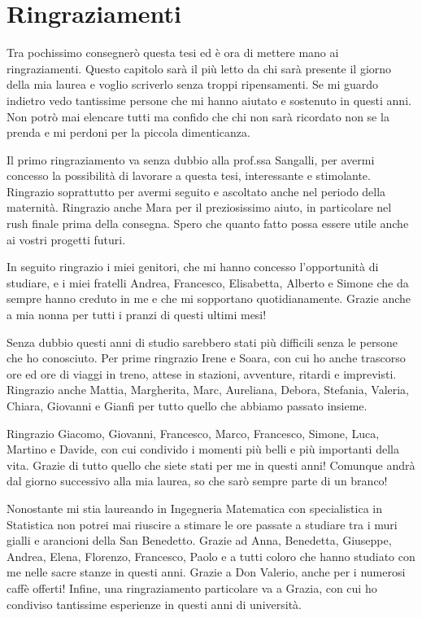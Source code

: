 \documentclass[a4paper,11pt,twoside,openright]{book}							%
\begin{document}
\chapter*{Ringraziamenti}
\thispagestyle{empty}
Tra pochissimo consegnerò questa tesi ed è ora di mettere mano ai ringraziamenti. Questo capitolo sarà il più letto da chi sarà presente il giorno della mia laurea e voglio scriverlo senza troppi ripensamenti. Se mi guardo indietro vedo tantissime persone che mi hanno aiutato e sostenuto in questi anni. Non potrò mai elencare tutti ma confido che chi non sarà ricordato non se la prenda e mi perdoni per la piccola dimenticanza.

Il primo ringraziamento va senza dubbio alla prof.ssa Sangalli, per avermi concesso la possibilità di lavorare a questa tesi, interessante e stimolante. Ringrazio soprattutto per avermi seguito e ascoltato anche nel periodo della maternità. Ringrazio anche Mara per il preziosissimo aiuto, in particolare nel rush finale prima della consegna. Spero che quanto fatto possa essere utile anche ai vostri progetti futuri.

In seguito ringrazio i miei genitori, che mi hanno concesso l'opportunità di studiare, e i miei fratelli Andrea, Francesco, Elisabetta, Alberto e Simone che da sempre hanno creduto in me e che mi sopportano quotidianamente. Grazie anche a mia nonna per tutti i pranzi di questi ultimi mesi!

Senza dubbio questi anni di studio sarebbero stati più difficili senza le persone che ho conosciuto. Per prime ringrazio Irene e Soara, con cui ho anche trascorso ore ed ore di viaggi in treno, attese in stazioni, avventure, ritardi e imprevisti. Ringrazio anche Mattia, Margherita, Marc, Aureliana, Debora, Stefania, Valeria, Chiara, Giovanni e Gianfi per tutto quello che abbiamo passato insieme.

Ringrazio Giacomo, Giovanni, Francesco, Marco, Francesco, Simone, Luca, Martino e Davide, con cui condivido i momenti più belli e più importanti della vita. Grazie di tutto quello che siete stati per me in questi anni! Comunque andrà dal giorno successivo alla mia laurea, so che sarò sempre parte di un branco!

Nonostante mi stia laureando in Ingegneria Matematica con specialistica in Statistica non potrei mai riuscire a stimare le ore passate a studiare tra i muri gialli e arancioni della San Benedetto. Grazie ad Anna, Benedetta, Giuseppe, Andrea, Elena, Florenzo, Francesco, Paolo e a tutti coloro che hanno studiato con me nelle sacre stanze in questi anni. Grazie a Don Valerio, anche per i numerosi caffè offerti! Infine, una ringraziamento particolare va a Grazia, con cui ho condiviso tantissime esperienze in questi anni di università.
\end{document}
